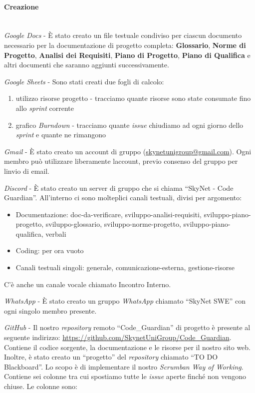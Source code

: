 \documentclass[12pt, a4paper]{article}
\begin{document}
 \paragraph{Creazione}\mbox{}\\
 \textit{Google Docs} - È stato creato un file testuale condiviso per ciascun documento necessario per la documentazione di progetto completa: \textbf{Glossario}, \textbf{Norme di Progetto}, \textbf{Analisi dei Requisiti}, \textbf{Piano di Progetto}, \textbf{Piano di Qualifica} e altri documenti che saranno aggiunti successivamente.
 
 \textit{Google Sheets} - Sono stati creati due fogli di calcolo:

\begin{enumerate}
\def\labelenumi{\arabic{enumi}.}
\item
  utilizzo risorse progetto - tracciamo quante risorse sono state consumate fino allo \textit{sprint} corrente
\item
  grafico \textit{Burndown} - tracciamo quante \textit{issue} chiudiamo ad ogni giorno dello \textit{sprint} e quante ne rimangono
\end{enumerate}

 \textit{Gmail} - È stato creato un account di gruppo (\href{mailto:skynetunigroup@gmail.com}{ {skynetunigroup@gmail.com}}). Ogni membro può utilizzare liberamente l\textquotesingle account, previo consenso del gruppo per l\textquotesingle invio di email.
 
 \textit{Discord} - È stato creato un server di gruppo che si chiama ``SkyNet - Code Guardian''. All'interno ci sono molteplici canali testuali, divisi per argomento:

\begin{itemize}
\item
  Documentazione: doc-da-verificare, sviluppo-analisi-requisiti, sviluppo-piano-progetto, sviluppo-glossario, sviluppo-norme-progetto, sviluppo-piano-qualifica, verbali
\item
  Coding: per ora vuoto
\item
  Canali testuali singoli: generale, comunicazione-esterna, gestione-risorse
\end{itemize}

C'è anche un canale vocale chiamato Incontro Interno.

 \textit{WhatsApp} - È stato creato un gruppo \textit{WhatsApp} chiamato ``SkyNet SWE'' con ogni singolo membro presente.
 
 \textit{GitHub} - Il nostro \textit{repository} remoto ``Code\_Guardian'' di progetto è presente al seguente indirizzo: \href{https://github.com/SkynetUniGroup/Code_Guardian}{ {https://github.com/SkynetUniGroup/Code\_Guardian}}. Contiene il codice sorgente, la documentazione e le risorse per il nostro sito web.\\
Inoltre, è stato creato un ``progetto'' del \textit{repository} chiamato ``TO DO Blackboard''. Lo scopo è di implementare il nostro \textit{Scrumban} \textit{Way of Working}. Contiene sei colonne tra cui spostiamo tutte le \textit{issue} aperte finché non vengono chiuse. Le colonne sono:
\end{document}
